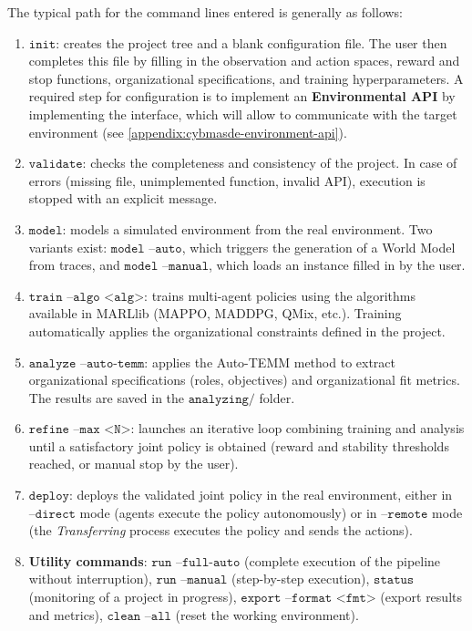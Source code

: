 \noindent The typical path for the command lines entered is generally as follows:
\begin{enumerate}
  \item \textbf{$\texttt{init}$}: creates the project tree and a blank configuration file.
        The user then completes this file by filling in the observation and action spaces, reward and stop functions, organizational specifications, and training hyperparameters. A required step for configuration is to implement an \textbf{Environmental API} by implementing the  interface, which will allow  to communicate with the target environment (see \autoref{appendix:cybmasde-environment-api}).
  \item \textbf{$\texttt{validate}$}: checks the completeness and consistency of the project.
        In case of errors (missing file, unimplemented function, invalid API), execution is stopped with an explicit message.
  \item \textbf{$\texttt{model}$}: models a simulated environment from the real environment.
        Two variants exist:
        $\texttt{model --auto}$, which triggers the generation of a World Model from traces, and
        $\texttt{model --manual}$, which loads an instance  filled in by the user.
  \item \textbf{$\texttt{train --algo <alg>}$}: trains multi-agent policies using the algorithms available in MARLlib (MAPPO, MADDPG, QMix, etc.).
        Training automatically applies the organizational constraints defined in the project.
  \item \textbf{$\texttt{analyze --auto-temm}$}: applies the Auto-TEMM method to extract organizational specifications (roles, objectives) and organizational fit metrics.
        The results are saved in the $\texttt{analyzing/}$ folder.
  \item \textbf{$\texttt{refine --max <N>}$}: launches an iterative loop combining training and analysis until a satisfactory joint policy is obtained (reward and stability thresholds reached, or manual stop by the user).
  \item \textbf{$\texttt{deploy}$}: deploys the validated joint policy in the real environment, either in $\texttt{--direct}$ mode (agents execute the policy autonomously) or in $\texttt{--remote}$ mode (the \textit{Transferring} process executes the policy and sends the actions).
  \item \textbf{Utility commands}:
        $\texttt{run --full-auto}$ (complete execution of the pipeline without interruption),
        $\texttt{run --manual}$ (step-by-step execution),
        $\texttt{status}$ (monitoring of a project in progress),
        $\texttt{export --format <fmt>}$ (export results and metrics),
        $\texttt{clean --all}$ (reset the working environment).
\end{enumerate}

